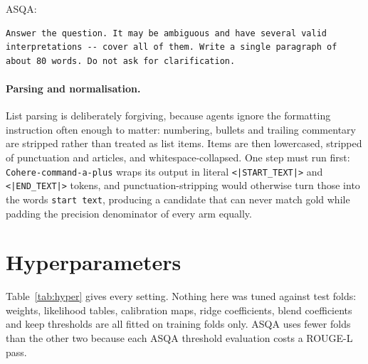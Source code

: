 \documentclass{article}
\begin{document}
ASQA:
\begin{verbatim}
Answer the question. It may be ambiguous and have several valid
interpretations -- cover all of them. Write a single paragraph of
about 80 words. Do not ask for clarification.
\end{verbatim}

\paragraph{Parsing and normalisation.}
List parsing is deliberately forgiving, because agents ignore the formatting instruction often enough to matter: numbering, bullets and trailing commentary are stripped rather than treated as list items. Items are then lowercased, stripped of punctuation and articles, and whitespace-collapsed. One step must run first: \texttt{Cohere-command-a-plus} wraps its output in literal \verb+<|START_TEXT|>+ and \verb+<|END_TEXT|>+ tokens, and punctuation-stripping would otherwise turn those into the words \texttt{start text}, producing a candidate that can never match gold while padding the precision denominator of every arm equally.

\section{Hyperparameters}
\label{app:hyper}

Table~\ref{tab:hyper} gives every setting. Nothing here was tuned against test folds: weights, likelihood tables, calibration maps, ridge coefficients, blend coefficients and keep thresholds are all fitted on training folds only. ASQA uses fewer folds than the other two because each ASQA threshold evaluation costs a ROUGE-L pass.
\end{document}
